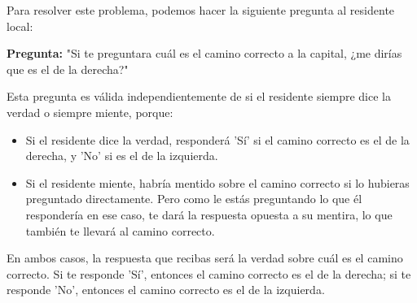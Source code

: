 \begin{solution}
Para resolver este problema, podemos hacer la siguiente pregunta al residente local:

\textbf{Pregunta:} "Si te preguntara cuál es el camino correcto a la capital, ¿me dirías que es el de la derecha?"

Esta pregunta es válida independientemente de si el residente siempre dice la verdad o siempre miente, porque:

\begin{itemize}
    \item Si el residente dice la verdad, responderá 'Sí' si el camino correcto es el de la derecha, y 'No' si es el de la izquierda.
    \item Si el residente miente, habría mentido sobre el camino correcto si lo hubieras preguntado directamente. Pero como le estás preguntando lo que él respondería en ese caso, te dará la respuesta opuesta a su mentira, lo que también te llevará al camino correcto.
\end{itemize}

En ambos casos, la respuesta que recibas será la verdad sobre cuál es el camino correcto. Si te responde 'Sí', entonces el camino correcto es el de la derecha; si te responde 'No', entonces el camino correcto es el de la izquierda.

\end{solution}
